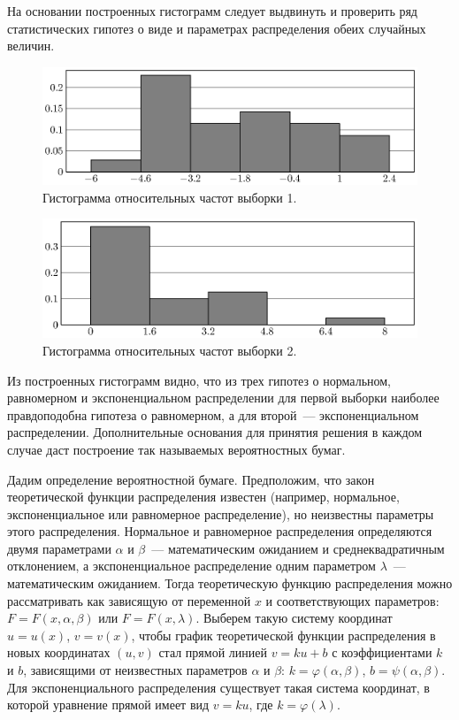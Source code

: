 \par
На основании построенных гистограмм следует выдвинуть и проверить ряд 
статистических гипотез о виде и параметрах распределения обеих случайных 
величин.

\begin{figure}[t]
  \includegraphics[scale=1]{images/st.3.eps}
  \caption{Гистограмма относительных частот выборки 1.}\label{pic3}
\end{figure}

\begin{figure}[t]
  \includegraphics[scale=1]{images/st.4.eps}
  \caption{Гистограмма относительных частот выборки 2.}\label{pic4}
\end{figure}

\par



Из построенных гистограмм видно, что из трех гипотез о нормальном, 
равномерном и экспоненциальном распределении для первой выборки наиболее 
правдоподобна гипотеза о равномерном, а для второй~--- 
экспоненциальном распределении. Дополнительные основания 
для принятия решения в каждом случае даст построение так называемых 
вероятностных бумаг.


\par
Дадим определение вероятностной бумаге. Предположим, что закон теоретической 
функции распределения известен (например, нормальное, экспоненциальное или 
равномерное распределение), но неизвестны параметры этого распределения. 
Нормальное и равномерное распределения определяются двумя параметрами 
$\alpha$ и $\beta$~--- математическим ожиданием и среднеквадратичным 
отклонением, а экспоненциальное распределение одним параметром $\lambda$~---
математическим ожиданием. Тогда теоретическую функцию распределения можно 
рассматривать как зависящую от переменной $x$ и соответствующих параметров: 
$F = F(x, \alpha, \beta)$ или $F = F(x, \lambda)$. Выберем такую систему 
координат $u = u(x)$, $v = v(x)$, чтобы график теоретической функции 
распределения в новых координатах $(u, v)$ стал прямой линией $v = ku+b$ 
с коэффициентами $k$ и $b$, зависящими от неизвестных параметров $\alpha$ 
и $\beta$: $k = \varphi(\alpha, \beta)$, $b = \psi(\alpha, \beta)$. 
Для экспоненциального распределения существует такая система координат,
в которой уравнение прямой имеет вид $v = ku$, где $k = \varphi(\lambda)$.


